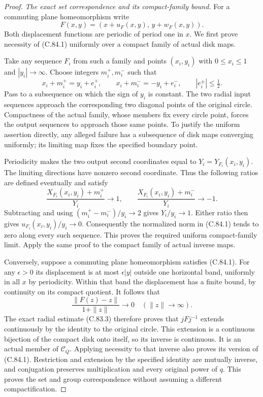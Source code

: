 \begin{proof}
\emph{The exact set correspondence and its compact-family bound.}
For a commuting plane homeomorphism write
\[
 F(x,y)=(x+u_F(x,y),\,y+w_F(x,y)).
                                                               \tag{C.84.3}
\]
Both displacement functions are periodic
of period one in $x$. We first prove
necessity of (C.84.1) uniformly over a
compact family of actual disk maps.

Take any sequence $F_i$ from such a
family and points $(x_i,y_i)$ with
$0\leq x_i\leq1$ and $|y_i|\to\infty$.
Choose integers $m_i^+,m_i^-$ such that
\[
 x_i+m_i^+=y_i+e_i^+,\qquad
 x_i+m_i^-=-y_i+e_i^-,\qquad
 |e_i^\pm|\leq\tfrac12.
                                                               \tag{C.84.4}
\]
Pass to a subsequence on which the sign
of $y_i$ is constant. The two radial
input sequences approach the corresponding
two diagonal points of the original
circle. Compactness of the actual family,
whose members fix every circle point,
forces the output sequences to approach
those same points. To justify the uniform
assertion directly, any alleged failure
has a subsequence of disk maps converging
uniformly; its limiting map fixes the
specified boundary point.

Periodicity makes the two output second
coordinates equal to $Y_i=Y_{F_i}(x_i,y_i)$.
The limiting directions have nonzero
second coordinate. Thus the following
ratios are defined eventually and satisfy
\[
 \frac{X_{F_i}(x_i,y_i)+m_i^+}{Y_i}\longrightarrow1,
 \qquad
 \frac{X_{F_i}(x_i,y_i)+m_i^-}{Y_i}\longrightarrow-1.
                                                               \tag{C.84.5}
\]
Subtracting and using
$(m_i^+-m_i^-)/y_i\to2$ gives $Y_i/y_i\to1$.
Either ratio then gives
$u_{F_i}(x_i,y_i)/y_i\to0$.
Consequently the normalized norm in
(C.84.1) tends to zero along every such
sequence. This proves the required
uniform compact-family limit.
Apply the same proof to the compact
family of actual inverse maps.

Conversely, suppose a commuting plane
homeomorphism satisfies (C.84.1).
For any $\epsilon>0$ its displacement
is at most $\epsilon|y|$ outside one
horizontal band, uniformly in all $x$
by periodicity. Within that band the
displacement has a finite bound, by
continuity on its compact quotient.
It follows that
\[
 \frac{\|F(z)-z\|}{1+\|z\|}\longrightarrow0
                   \quad(\|z\|\to\infty).
                                                               \tag{C.84.6}
\]
The exact radial estimate (C.83.3)
therefore proves that $jFj^{-1}$
extends continuously by the identity
to the original circle. This extension
is a continuous bijection of the
compact disk onto itself, so its
inverse is continuous. It is an
actual member of $\mathscr C_Q$.
Applying necessity to that inverse
also proves its version of (C.84.1).
Restriction and extension by the
specified identity are mutually inverse,
and conjugation preserves multiplication
and every original power of $q$.
This proves the set and group
correspondence without assuming a
different compactification.


\end{proof}
